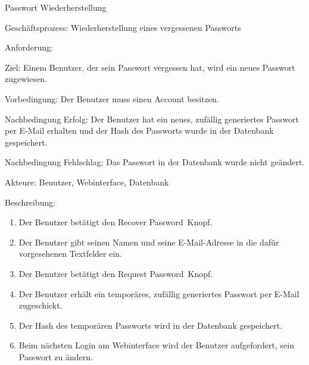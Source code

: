 \begin{function}{81}{Passwort Wiederherstellung}
\item[Geschäftsprozess:] Wiederherstellung eines vergessenen Passworts
\item[Anforderung:] 
\item[Ziel:] Einem Benutzer, der sein Passwort vergessen hat, wird ein neues Passwort zugewiesen.
\item[Vorbedingung:] Der Benutzer muss einen Account besitzen.
\item[Nachbedingung Erfolg:] Der Benutzer hat ein neues, zufällig generiertes Passwort per E-Mail erhalten und der Hash des Passworts wurde in der Datenbank gespeichert.
\item[Nachbedingung Fehlschlag:] Das Passwort in der Datenbank wurde nicht geändert.
\item[Akteure:] Benutzer, Webinterface, Datenbank
\item[Beschreibung:] ~
\begin{enumerate}
\item Der Benutzer betätigt den \glqq Recover Password\grqq\ Knopf.
\item Der Benutzer gibt seinen Namen und seine E-Mail-Adresse in die dafür vorgesehenen Textfelder ein.
\item Der Benutzer betätigt den \glqq Request Password\grqq\ Knopf.
\item Der Benutzer erhält ein temporäres, zufällig generiertes Passwort per E-Mail zugeschickt.
\item Der Hash des temporären Passworts wird in der Datenbank gespeichert.
\item Beim nächsten Login am Webinterface wird der Benutzer aufgefordert, sein Passwort zu ändern.
\end{enumerate}
\end{function} ~

